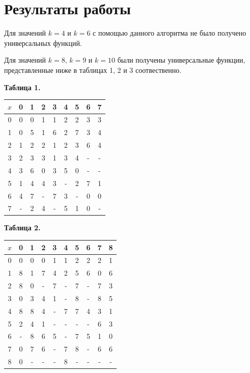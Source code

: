 \documentclass[oneside,final,14pt]{extreport}
\begin{document}
\chapter{Результаты работы}

Для значений \(k = 4\) и \(k = 6\) с помощью данного алгоритма не было получено универсальных функций.

Для значений \(k = 8\), \(k = 9\) и \(k = 10\) были получены универсальные функции, представленные ниже 
в таблицах 1, 2 и 3 соотвественно.

\centerline{\bf Таблица 1.}
\begin{center}
\begin{tabular}{|c|c|c|c|c|c|c|c|c|}
\hline \(x\) & 0 & 1 & 2 & 3 & 4 & 5 & 6 & 7 \\ \hline
0 & 0 & 0 & 1 & 1 & 2 & 2 & 3 & 3 \\ \hline 
1 & 0 & 5 & 1 & 6 & 2 & 7 & 3 & 4 \\ \hline
2 & 1 & 2 & 2 & 1 & 2 & 3 & 6 & 4 \\ \hline
3 & 2 & 3 & 3 & 1 & 3 & 4 & - & - \\ \hline
4 & 3 & 6 & 0 & 3 & 5 & 0 & - & - \\ \hline
5 & 1 & 4 & 4 & 3 & - & 2 & 7 & 1 \\ \hline
6 & 4 & 7 & - & 7 & 3 & - & 0 & 0 \\ \hline
7 & - & 2 & 4 & - & 5 & 1 & 0 & - \\ \hline
\end{tabular}
\end{center}

\centerline{\bf Таблица 2.}
\begin{center}
\begin{tabular}{|c|c|c|c|c|c|c|c|c|c|}
\hline \(x\) & 0 & 1 & 2 & 3 & 4 & 5 & 6 & 7 & 8 \\ \hline
0 & 0 & 0 & 0 & 1 & 1 & 2 & 2 & 2 & 1 \\ \hline 
1 & 8 & 1 & 7 & 4 & 2 & 5 & 6 & 0 & 6 \\ \hline
2 & 8 & 0 & - & 7 & - & 7 & - & 7 & 3 \\ \hline
3 & 0 & 3 & 4 & 1 & - & 8 & - & 8 & 5 \\ \hline
4 & 8 & 8 & 4 & - & 7 & 7 & 4 & 3 & 1 \\ \hline
5 & 2 & 4 & 1 & - & - & - & - & 6 & 3 \\ \hline
6 & - & 8 & 6 & 5 & - & 7 & 5 & 1 & 0 \\ \hline
7 & 0 & 7 & 6 & - & 7 & 8 & - & 6 & 6 \\ \hline
8 & 0 & - & - & - & 8 & - & - & - & - \\ \hline
\end{tabular}
\end{center}
\end{document}
